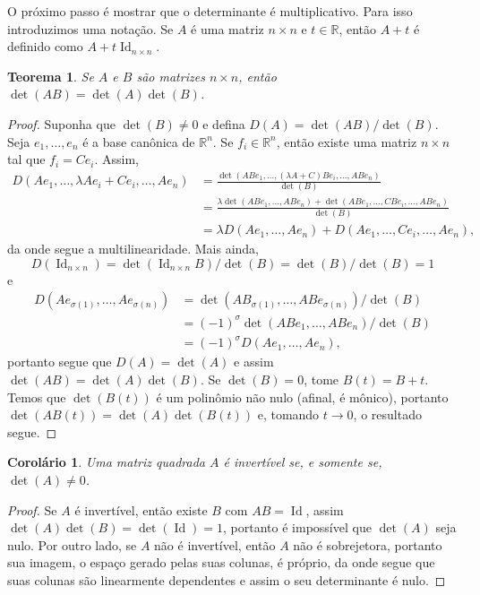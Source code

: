 \documentclass{article}
\newtheorem{corollary}[definition]{Corolário}
\newtheorem{theorem}[definition]{Teorema}
\DeclareMathOperator{\Id}{Id}
\begin{document}
O próximo passo é mostrar que o determinante é multiplicativo. Para isso introduzimos uma notação. Se $A$ é uma matriz $n \times n$ e $t \in \mathbb{R}$, então $A + t$ é definido como $A + t\Id_{n \times n}$.

\begin{theorem}
    Se $A$ e $B$ são matrizes $n \times n$, então $\det(AB) = \det(A)\det(B)$.
\end{theorem}
\begin{proof}
    Suponha que $\det(B) \neq 0$ e defina $D(A) = \det(AB)/\det(B)$. Seja $e_1, \dots, e_n$ é a base canônica de $\mathbb{R}^n$. Se $f_i \in \mathbb{R}^n$, então existe uma matriz $n \times n$ tal que $f_i = Ce_i$. Assim, \begin{align}
        D(Ae_1, \dots, \lambda Ae_i + Ce_i, \dots, Ae_n) &= \frac{\det(ABe_1, \dots, (\lambda A+C)Be_i, \dots, ABe_n)}{\det(B)} \\ &= \frac{\lambda \det(ABe_1, \dots, ABe_n) + \det(ABe_1, \dots, CBe_i, \dots, ABe_n)}{\det(B)} \\ &= \lambda D(Ae_1, \dots, Ae_n) + D(Ae_1, \dots, Ce_i, \dots, Ae_n),
    \end{align} da onde segue a multilinearidade. Mais ainda, \begin{equation}
        D(\Id_{n \times n}) = \det(\Id_{n \times n} B)/\det(B) = \det(B)/\det(B) = 1
    \end{equation} e \begin{align}
        D(Ae_{\sigma(1)}, \dots, Ae_{\sigma(n)}) &= \det(AB_{\sigma(1)}, \dots, ABe_{\sigma(n)})/\det(B) \\ &= (-1)^\sigma \det(ABe_1, \dots, ABe_n)/\det(B) \\ &= (-1)^\sigma D(Ae_1, \dots, Ae_n),
    \end{align} portanto segue que $D(A) = \det(A)$ e assim $\det(AB) = \det(A)\det(B)$. Se $\det(B) = 0$, tome $B(t) = B + t$. Temos que $\det(B(t))$ é um polinômio não nulo (afinal, é mônico), portanto $\det(AB(t)) = \det(A)\det(B(t))$ e, tomando $t \to 0$, o resultado segue.
\end{proof}

\begin{corollary}
    Uma matriz quadrada $A$ é invertível se, e somente se, $\det(A) \neq 0$.
\end{corollary}
\begin{proof}
    Se $A$ é invertível, então existe $B$ com $AB = \Id$, assim $\det(A) \det(B) = \det(\Id) = 1$, portanto é impossível que $\det(A)$ seja nulo. Por outro lado, se $A$ não é invertível, então $A$ não é sobrejetora, portanto sua imagem, o espaço gerado pelas suas colunas, é próprio, da onde segue que suas colunas são linearmente dependentes e assim o seu determinante é nulo.
\end{proof}
\end{document}
